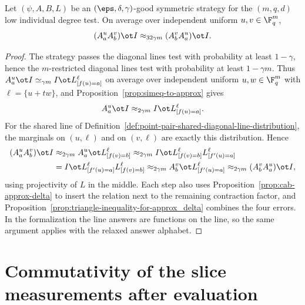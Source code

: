 \begin{theorem}\label{thm:commutativity-points}
	\leanok
	Let $(\psi,A,B,L)$ be an $(\eps,\delta,\gamma)$-good symmetric strategy for
	the $(m,q,d)$ low individual degree test.  On average over independent
	uniform $u,v\in\F_q^m$,
	\[
		(A^u_aA^v_b)\ot I\approx_{32\gamma m}(A^v_bA^u_a)\ot I.
	\]
\end{theorem}
\begin{proof}
	\leanok
	The strategy passes the diagonal lines test with probability at least
	$1-\gamma$, hence the $m$-restricted diagonal lines test with probability
	at least $1-\gamma m$.  Thus
	$A^u_a\ot I\simeq_{\gamma m}I\ot L^\ell_{[f(u)=a]}$ on average over
	independent uniform $u,w\in\F_q^m$ with $\ell=\{u+tw\}$, and
	Proposition~\ref{prop:simeq-to-approx} gives
	\[
		A^u_a\ot I\approx_{2\gamma m}I\ot L^\ell_{[f(u)=a]}.
	\]
	For the shared line of
	Definition~\ref{def:point-pair-shared-diagonal-line-distribution}, the
	marginals on $(u,\ell)$ and on $(v,\ell)$ are exactly this distribution.
	Hence
	\begin{align*}
		(A^u_aA^v_b)\ot I
		 & \approx_{2\gamma m}A^u_a\ot L^\ell_{[f(v)=b]}
		\approx_{2\gamma m}I\ot L^\ell_{[f(v)=b]}L^\ell_{[f'(u)=a]} \\
		 & =I\ot L^\ell_{[f'(u)=a]}L^\ell_{[f(v)=b]}
		\approx_{2\gamma m}A^v_b\ot L^\ell_{[f'(u)=a]}
		\approx_{2\gamma m}(A^v_bA^u_a)\ot I,
	\end{align*}
	using projectivity of $L$ in the middle.  Each step also uses
	Proposition~\ref{prop:cab-approx-delta} to insert the relation next to the
	remaining contraction factor, and
	Proposition~\ref{prop:triangle-inequality-for-approx_delta} combines the
	four errors.  In the formalization the line answers are functions on the
	line, so the same argument applies with the relaxed answer alphabet.
\end{proof}

\section{Commutativity of the slice measurements after evaluation}
\label{sec:G-commutes-after-evaluation}


